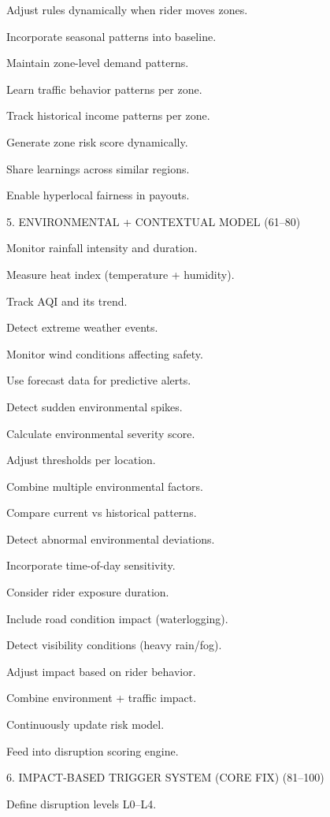 Adjust rules dynamically when rider moves zones. 

Incorporate seasonal patterns into baseline. 

Maintain zone-level demand patterns. 

Learn traffic behavior patterns per zone. 

Track historical income patterns per zone. 

Generate zone risk score dynamically. 

Share learnings across similar regions. 

Enable hyperlocal fairness in payouts. 

 

 5. ENVIRONMENTAL + CONTEXTUAL MODEL (61–80) 

Monitor rainfall intensity and duration. 

Measure heat index (temperature + humidity). 

Track AQI and its trend. 

Detect extreme weather events. 

Monitor wind conditions affecting safety. 

Use forecast data for predictive alerts. 

Detect sudden environmental spikes. 

Calculate environmental severity score. 

Adjust thresholds per location. 

Combine multiple environmental factors. 

Compare current vs historical patterns. 

Detect abnormal environmental deviations. 

Incorporate time-of-day sensitivity. 

Consider rider exposure duration. 

Include road condition impact (waterlogging). 

Detect visibility conditions (heavy rain/fog). 

Adjust impact based on rider behavior. 

Combine environment + traffic impact. 

Continuously update risk model. 

Feed into disruption scoring engine. 

 

 6. IMPACT-BASED TRIGGER SYSTEM (CORE FIX) (81–100) 

Define disruption levels L0–L4. 

